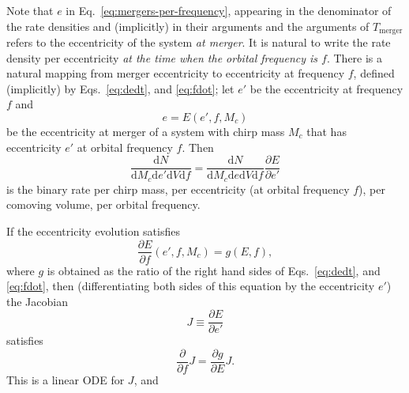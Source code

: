\documentclass[twocolumn]{aastex631}
\newcommand{\dd}{\mathrm{d}}
\newcommand{\diff}[2]{\frac{\dd #1}{\dd #2}}
\begin{document}
Note that $e$ in Eq.\ \eqref{eq:mergers-per-frequency}, appearing in the
denominator of the rate densities and (implicitly) in their arguments and the
arguments of $T_\mathrm{merger}$ refers to the eccentricity of the system
\emph{at merger}.  It is natural to write the rate density per eccentricity
\emph{at the time when the orbital frequency is $f$}.  There is a natural
mapping from merger eccentricity to eccentricity at frequency $f$, defined
(implicitly) by Eqs.\ \eqref{eq:dedt}, and \eqref{eq:fdot}; let
$e'$ be the eccentricity at frequency $f$ and 
\begin{equation}
    e = E\left( e', f, M_c \right)
\end{equation}
be the eccentricity at merger of a system with chirp mass $M_c$ that has
eccentricity $e'$ at orbital frequency $f$.  Then 
\begin{equation}
    \diff{N}{M_c \dd e' \dd V \dd f} = \diff{N}{M_c \dd e \dd V \dd f} \frac{\partial E}{\partial e'}
\end{equation}
is the binary rate per chirp mass, per eccentricity (at orbital frequency $f$),
per comoving volume, per orbital frequency.  

If the eccentricity evolution satisfies 
\begin{equation}
    \frac{\partial E}{\partial f}\left( e', f, M_c \right) = g\left( E, f \right),
\end{equation}
where $g$ is obtained as the ratio of the right hand sides of Eqs.\
\eqref{eq:dedt}, and \eqref{eq:fdot}, then (differentiating both sides of this
equation by the eccentricity $e'$) the Jacobian 
\begin{equation}
    J \equiv \frac{\partial E}{\partial e'}
\end{equation}
satisfies 
\begin{equation}
    \frac{\partial}{\partial f} J = \frac{\partial g}{\partial E} J.
\end{equation}
This is a linear ODE for $J$, and 


\end{document}
